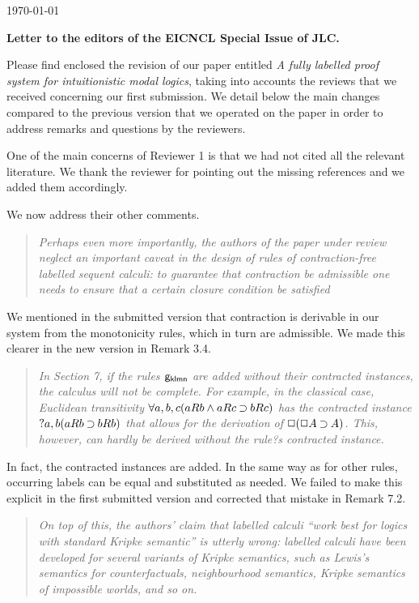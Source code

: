 \documentclass[10pt]{article}
\begin{document}
\hfill \today
\bigskip

\noindent\textbf{Letter to the editors of the EICNCL Special Issue of JLC.}
\bigskip

\medskip

Please find enclosed the revision of our paper entitled {\it A fully labelled 
proof system for intuitionistic modal logics}, taking into accounts the reviews
that we received concerning our first submission.
%
We detail below the main changes compared to the previous version that we operated 
on the paper in order to address remarks and questions by the reviewers.
\smallskip

One of the main concerns of Reviewer 1 is that we had not cited all
the relevant literature. We thank the reviewer for pointing out the
missing references and we added them accordingly.

We now address their other comments.

\begin{quote}\it
	Perhaps even more importantly, the authors of the paper under 
	review neglect an important caveat in the design of rules of 
	contraction-free labelled sequent calculi: to guarantee that 
	contraction be admissible one needs to ensure that a certain 
	closure condition be satisfied
\end{quote}

We mentioned in the submitted version that contraction is derivable 
in our system from the monotonicity rules, which in turn
are admissible. We made this clearer in the new version in
Remark 3.4.

\begin{quote}\it
	In Section 7, if the rules ${\mathsf{g_{klmn}}}$ are added without their 
	contracted instances, the calculus will not be complete. For 
	example, in the classical case, Euclidean transitivity $\forall a, b, 
	c(aRb \mathbin{\wedge} aRc \mathbin{\supset} bRc)$ has the contracted instance $?a, b(aRb \mathbin{\supset} bRb)$ that 
	allows for the derivation of $\mathord{\Box}(\mathord{\Box} A \mathbin{\supset} A)$. This, however, can 
	hardly be derived without the rule?s contracted instance.
\end{quote}

In fact, the contracted instances are added. In the same way as for
other rules, occurring labels can be equal and substituted as needed. 
We failed to make this explicit in the first submitted version and 
corrected that mistake in Remark 7.2.

\begin{quote}\it
	On top of this, the authors' claim that labelled calculi ``work best 
	for logics with standard Kripke semantic'' is utterly wrong: 
	labelled calculi have been developed for several variants of Kripke 
	semantics, such as Lewis's semantics for counterfactuals, 
	neighbourhood semantics, Kripke semantics of impossible worlds, and 
	so on.
\end{quote}
\end{document}
